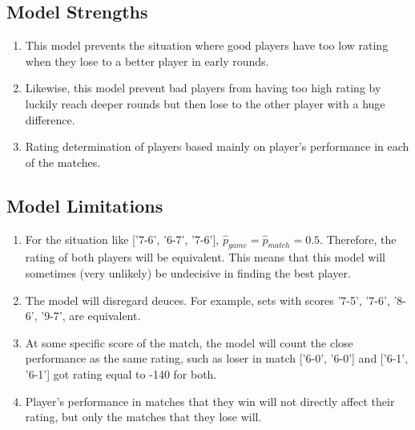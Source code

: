 \subsection{Model Strengths}
\begin{enumerate}
    \item This model prevents the situation where good players have too low rating when they lose to a better player in early rounds.
    \item Likewise, this model prevent bad players from having too high rating by luckily reach deeper rounds but then lose to the other player with a huge difference.
    \item Rating determination of players based mainly on player's performance in each of the matches. %
\end{enumerate}
\subsection{Model Limitations}
\begin{enumerate}
    \item For the situation like ['7-6', '6-7', '7-6'], $\hat{p}_{game} = \hat{p}_{match} = 0.5$. Therefore, the rating of both players will be equivalent. This means that this model will sometimes (very unlikely) be undecisive in finding the best player.
    \item The model will disregard deuces. For example, sets with scores '7-5', '7-6', '8-6', '9-7', are equivalent.
    \item At some specific score of the match, the model will count the close performance as the same rating, such as loser in match ['6-0', '6-0'] and ['6-1', '6-1'] got rating equal to -140 for both.
    \item Player's performance in matches that they win will not directly affect their rating, but only the matches that they lose will. %
\end{enumerate}